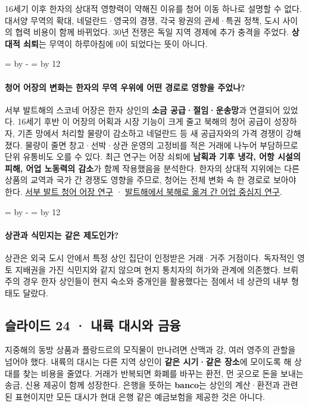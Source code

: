 \documentclass[10pt,a4paper]{article}
\newcommand{\ReserveQuestionSpace}{%
  \par\begingroup
  \dimen0=\pagegoal \advance\dimen0 by -\pagetotal
  \dimen2=\baselineskip \multiply\dimen2 by 12
  \ifdim\dimen0<\dimen2 \newpage\fi
  \endgroup}
\begin{document}
16세기 이후 한자의 상대적 영향력이 약해진 이유를 청어 이동 하나로 설명할 수 없다. 대서양 무역의 확대, 네덜란드·영국의 경쟁, 각국 왕권의 관세·특권 정책, 도시 사이의 협력 비용이 함께 바뀌었다. 30년 전쟁은 독일 지역 경제에 추가 충격을 주었다. \textbf{상대적 쇠퇴}는 무역이 하루아침에 0이 되었다는 뜻이 아니다.\par

\ReserveQuestionSpace
\paragraph{청어 어장의 변화는 한자의 무역 우위에 어떤 경로로 영향을 주었나?}
서부 발트해의 스코네 어장은 한자 상인의 \textbf{소금 공급·절임·운송망}과 연결되어 있었다. 16세기 후반 이 어장의 어획과 시장 기능이 크게 줄고 북해의 청어 공급이 성장하자, 기존 망에서 처리할 물량이 감소하고 네덜란드 등 새 공급자와의 가격 경쟁이 강해졌다. 물량이 줄면 창고·선박·상관 운영의 고정비를 적은 거래에 나누어 부담하므로 단위 유통비도 오를 수 있다. 최근 연구는 어장 쇠퇴에 \textbf{남획과 기후 냉각, 어항 시설의 피해, 어업 노동력의 감소}가 함께 작용했음을 분석한다. 한자의 상대적 지위에는 다른 상품의 교역과 국가 간 경쟁도 영향을 주므로, 청어는 전체 변화 속 한 경로로 보아야 한다. \href{https://www.nature.com/articles/s41893-026-01937-1}{서부 발트 청어 어장 연구} · \href{https://onlinelibrary.wiley.com/doi/full/10.1111/faf.12598}{발트해에서 북해로 옮겨 간 어업 중심지 연구}.\par

\ReserveQuestionSpace
\paragraph{상관과 식민지는 같은 제도인가?}
상관은 외국 도시 안에서 특정 상인 집단이 인정받은 거래·거주 거점이다. 독자적인 영토 지배권을 가진 식민지와 같지 않으며 현지 통치자의 허가와 관계에 의존했다. 브뤼주의 경우 한자 상인들이 현지 숙소와 중개인을 활용했다는 점에서 네 상관의 내부 형태도 달랐다.\par

\subsection{슬라이드 24 · 내륙 대시와 금융}
지중해의 동방 상품과 플랑드르의 모직물이 만나려면 산맥과 강, 여러 영주의 관할을 넘어야 했다. 내륙의 대시는 다른 지역 상인이 \textbf{같은 시기·같은 장소}에 모이도록 해 상대를 찾는 비용을 줄였다. 거래가 반복되면 화폐를 바꾸는 환전, 먼 곳으로 돈을 보내는 송금, 신용 제공이 함께 성장한다. 은행을 뜻하는 \textbf{banco}는 상인의 계산·환전과 관련된 표현이지만 모든 대시가 현대 은행 같은 예금보험을 제공한 것은 아니다.\par
\end{document}
